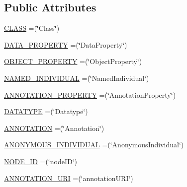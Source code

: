\subsection*{Public Attributes}
\begin{DoxyCompactItemize}
\item 
\hyperlink{enumorg_1_1semanticweb_1_1owlapi_1_1vocab_1_1_o_w_l_x_m_l_vocabulary_ab41458c7b8643f10a27ed4b5a94c9162}{C\-L\-A\-S\-S} =(\char`\"{}Class\char`\"{})
\item 
\hyperlink{enumorg_1_1semanticweb_1_1owlapi_1_1vocab_1_1_o_w_l_x_m_l_vocabulary_a0bc28f11e7c4004d9df61c3cb63d7ee4}{D\-A\-T\-A\-\_\-\-P\-R\-O\-P\-E\-R\-T\-Y} =(\char`\"{}Data\-Property\char`\"{})
\item 
\hyperlink{enumorg_1_1semanticweb_1_1owlapi_1_1vocab_1_1_o_w_l_x_m_l_vocabulary_acc850e2755202e8d8924b088b3c747fe}{O\-B\-J\-E\-C\-T\-\_\-\-P\-R\-O\-P\-E\-R\-T\-Y} =(\char`\"{}Object\-Property\char`\"{})
\item 
\hyperlink{enumorg_1_1semanticweb_1_1owlapi_1_1vocab_1_1_o_w_l_x_m_l_vocabulary_acf83619d90fe1cc38b2cd70da8fa5506}{N\-A\-M\-E\-D\-\_\-\-I\-N\-D\-I\-V\-I\-D\-U\-A\-L} =(\char`\"{}Named\-Individual\char`\"{})
\item 
\hyperlink{enumorg_1_1semanticweb_1_1owlapi_1_1vocab_1_1_o_w_l_x_m_l_vocabulary_a5869b45f5293516871bfe36ee3ec7760}{A\-N\-N\-O\-T\-A\-T\-I\-O\-N\-\_\-\-P\-R\-O\-P\-E\-R\-T\-Y} =(\char`\"{}Annotation\-Property\char`\"{})
\item 
\hyperlink{enumorg_1_1semanticweb_1_1owlapi_1_1vocab_1_1_o_w_l_x_m_l_vocabulary_a793af4c9c7033580b859623258910785}{D\-A\-T\-A\-T\-Y\-P\-E} =(\char`\"{}Datatype\char`\"{})
\item 
\hyperlink{enumorg_1_1semanticweb_1_1owlapi_1_1vocab_1_1_o_w_l_x_m_l_vocabulary_a2769165615abc5cef851cbf51be9ffbc}{A\-N\-N\-O\-T\-A\-T\-I\-O\-N} =(\char`\"{}Annotation\char`\"{})
\item 
\hyperlink{enumorg_1_1semanticweb_1_1owlapi_1_1vocab_1_1_o_w_l_x_m_l_vocabulary_a3321f005cd4967f7bb66a9b8ce03eef8}{A\-N\-O\-N\-Y\-M\-O\-U\-S\-\_\-\-I\-N\-D\-I\-V\-I\-D\-U\-A\-L} =(\char`\"{}Anonymous\-Individual\char`\"{})
\item 
\hyperlink{enumorg_1_1semanticweb_1_1owlapi_1_1vocab_1_1_o_w_l_x_m_l_vocabulary_a85907ee7964138562841ea608cafa1ad}{N\-O\-D\-E\-\_\-\-I\-D} =(\char`\"{}node\-I\-D\char`\"{})
\item 
\hyperlink{enumorg_1_1semanticweb_1_1owlapi_1_1vocab_1_1_o_w_l_x_m_l_vocabulary_a4f5a5846f0e66b2c59871addcdbaa568}{A\-N\-N\-O\-T\-A\-T\-I\-O\-N\-\_\-\-U\-R\-I} =(\char`\"{}annotation\-U\-R\-I\char`\"{})

\end{DoxyCompactItemize}
